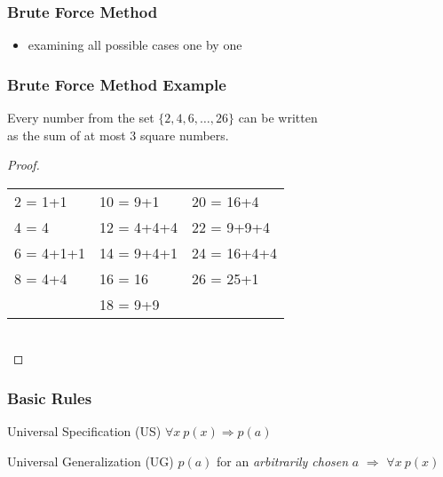 \documentclass[dvipsnames]{beamer}
\begin{document}
\begin{frame}
  \frametitle{Brute Force Method}

  \begin{itemize}
    \item examining all possible cases one by one
  \end{itemize}
\end{frame}

\begin{frame}
  \frametitle{Brute Force Method Example}

  \begin{theorem}
    Every number from the set $\{2,4,6,\dots,26\}$ can be written\\
    as the sum of at most 3 square numbers.
  \end{theorem}

  \pause
  \begin{proof}
    \begin{tabular}{lll}
      2 = 1+1   & 10 = 9+1    & 20 = 16+4\\
      4 = 4     & 12 = 4+4+4  & 22 = 9+9+4\\
      6 = 4+1+1 & 14 = 9+4+1  & 24 = 16+4+4\\
      8 = 4+4   & 16 = 16     & 26 = 25+1\\
                & 18 = 9+9    &
    \end{tabular}\\
  \end{proof}
\end{frame}

\begin{frame}
  \frametitle{Basic Rules}

  \begin{block}{Universal Specification (US)}
    $\forall x~p(x) \Rightarrow p(a)$
  \end{block}

  \pause
  \begin{block}{Universal Generalization (UG)}
    $p(a)$ for an \emph{arbitrarily chosen} $a$
      $\Rightarrow$ $\forall x~p(x)$
  \end{block}
\end{frame}
\end{document}
